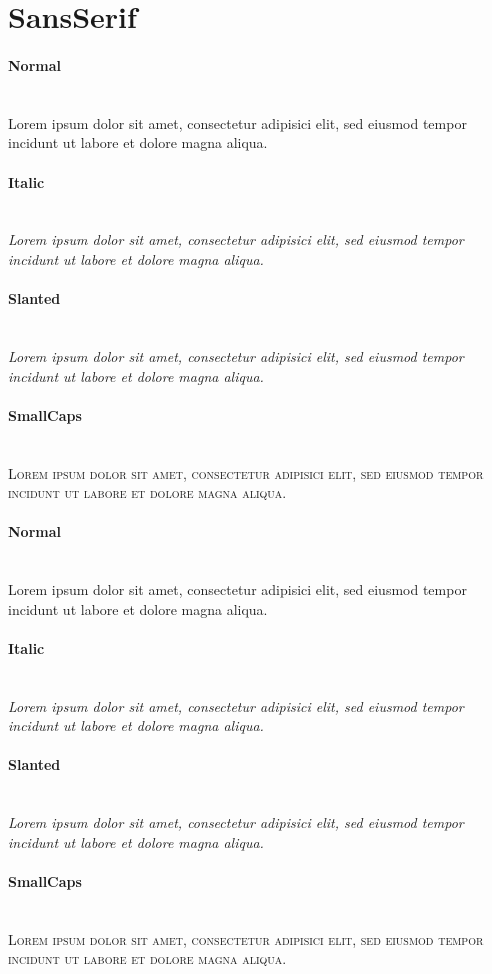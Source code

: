 \documentclass{scrartcl}
\begin{document}
\section*{SansSerif}

{\sffamily
\paragraph{Normal}\hfill\\
{
Lorem ipsum dolor sit amet, consectetur adipisici elit, sed eiusmod tempor
incidunt ut labore et dolore magna aliqua.}
\paragraph{Italic}\hfill\\
{\itshape
Lorem ipsum dolor sit amet, consectetur adipisici elit, sed eiusmod tempor
incidunt ut labore et dolore magna aliqua.}
\paragraph{Slanted}\hfill\\
{\slshape
Lorem ipsum dolor sit amet, consectetur adipisici elit, sed eiusmod tempor
incidunt ut labore et dolore magna aliqua.}
\paragraph{SmallCaps}\hfill\\
{\scshape
Lorem ipsum dolor sit amet, consectetur adipisici elit, sed eiusmod tempor
incidunt ut labore et dolore magna aliqua.}

{\bfseries
\paragraph{Normal}\hfill\\
{
Lorem ipsum dolor sit amet, consectetur adipisici elit, sed eiusmod tempor
incidunt ut labore et dolore magna aliqua.}
\paragraph{Italic}\hfill\\
{\itshape
Lorem ipsum dolor sit amet, consectetur adipisici elit, sed eiusmod tempor
incidunt ut labore et dolore magna aliqua.}
\paragraph{Slanted}\hfill\\
{\slshape
Lorem ipsum dolor sit amet, consectetur adipisici elit, sed eiusmod tempor
incidunt ut labore et dolore magna aliqua.}
\paragraph{SmallCaps}\hfill\\
{\scshape
Lorem ipsum dolor sit amet, consectetur adipisici elit, sed eiusmod tempor
incidunt ut labore et dolore magna aliqua.}
}
}
\end{document}
